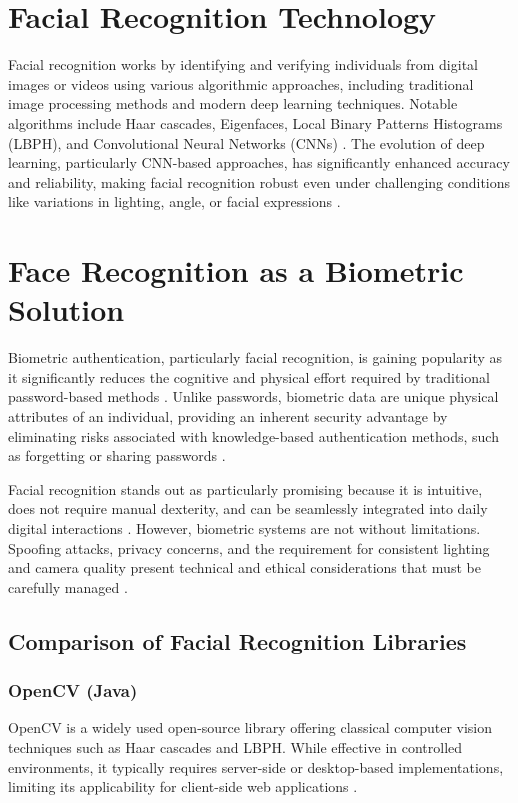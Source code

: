 \section{Facial Recognition Technology}
Facial recognition works by identifying and verifying individuals from digital images or videos using various algorithmic approaches, including traditional image processing methods and modern deep learning techniques. Notable algorithms include Haar cascades, Eigenfaces, Local Binary Patterns Histograms (LBPH), and Convolutional Neural Networks (CNNs) \autocite{ElSayed2015}. The evolution of deep learning, particularly CNN-based approaches, has significantly enhanced accuracy and reliability, making facial recognition robust even under challenging conditions like variations in lighting, angle, or facial expressions \autocite{ZhangDlib2020}.

\section{Face Recognition as a Biometric Solution}
Biometric authentication, particularly facial recognition, is gaining popularity as it significantly reduces the cognitive and physical effort required by traditional password-based methods \autocite{Furnell2022}. 
Unlike passwords, biometric data are unique physical attributes of an individual, providing an inherent security advantage by eliminating risks associated with knowledge-based authentication methods, 
such as forgetting or sharing passwords \autocite{Pant2022}.

Facial recognition stands out as particularly promising because it is intuitive, does not require manual dexterity, and can be seamlessly integrated into daily digital interactions \autocite{Bhatt2011}. However, biometric systems are not without limitations. Spoofing attacks, privacy concerns, and the requirement for consistent lighting and camera quality present technical and ethical considerations that must be carefully managed \autocite{Kuznetsov2024, Bahia2024}.


\subsection{Comparison of Facial Recognition Libraries}

\subsubsection{OpenCV (Java)}
OpenCV is a widely used open-source library offering classical computer vision techniques such as Haar cascades and LBPH. While effective in controlled environments, it typically requires server-side or desktop-based implementations, limiting its applicability for client-side web applications \autocite{Dominguez2017}.

